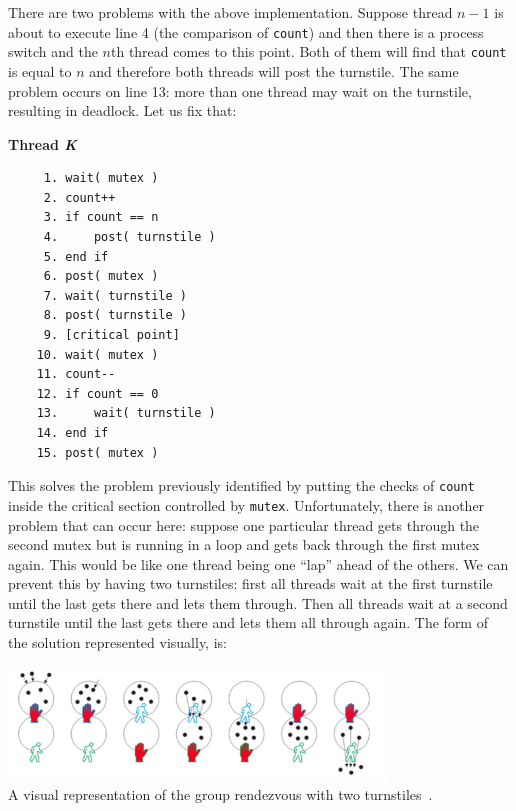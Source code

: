There are two problems with the above implementation. Suppose thread $n-1$ is about to execute line 4 (the comparison of \texttt{count}) and then there is a process switch and the $n$th thread comes to this point. Both of them will find that \texttt{count} is equal to $n$ and therefore both threads will post the turnstile. The same problem occurs on line 13: more than one thread may wait on the turnstile, resulting in deadlock. Let us fix that:


\textbf{Thread \textit{K}}\vspace{-2em}
  \begin{verbatim}
	 1. wait( mutex )
	 2. count++
	 3. if count == n
	 4.     post( turnstile )
	 5. end if
	 6. post( mutex )
	 7. wait( turnstile )
	 8. post( turnstile )
	 9. [critical point]
	10. wait( mutex )
	11. count--
	12. if count == 0
	13.     wait( turnstile )
	14. end if
	15. post( mutex )
  \end{verbatim}
\vspace{-2em}

This solves the problem previously identified by putting the checks of \texttt{count} inside the critical section controlled by \texttt{mutex}. Unfortunately, there is another problem that can occur here: suppose one particular thread gets through the second mutex but is running in a loop and gets back through the first mutex again. This would be like one thread being one ``lap'' ahead of the others. We can prevent this by having two turnstiles: first all threads wait at the first turnstile until the last gets there and lets them through. Then all threads wait at a second turnstile until the last gets there and lets them all through again. The form of the solution represented visually, is:

\begin{center}
\includegraphics[width=0.75\textwidth]{images/reusable-barrier.png}\\
	A visual representation of the group rendezvous with two turnstiles~\cite{mte241}.
\end{center}

